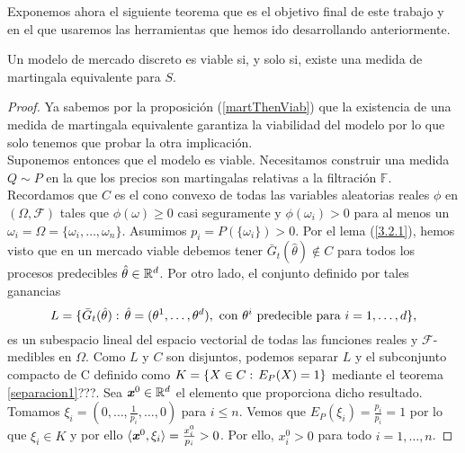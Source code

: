 Exponemos ahora el siguiente teorema que es el objetivo final de este trabajo y en el que usaremos las herramientas que hemos ido desarrollando anteriormente.
\begin{teoremaBox}
	Un modelo de mercado discreto es viable si, y solo si, existe una medida de martingala equivalente para $ S $.
\end{teoremaBox}
\begin{proof}
	Ya sabemos por la proposición (\ref{martThenViab}) que la existencia de una medida de martingala equivalente garantiza la viabilidad del modelo por lo que solo tenemos que probar la otra implicación. \\
	
	Suponemos entonces que el modelo es viable. Necesitamos construir una medida $ Q \sim P $ en la que los precios son martingalas relativas a la filtración $ \mathbb{F} $. Recordamos que $ C $ es el cono convexo de todas las variables aleatorias reales $ \phi $ en $ (\Omega, \mathcal{F}) $ tales que $ \phi(\omega) \geq 0 $ casi seguramente y $ \phi(\omega_i) > 0 $ para al menos un $ \omega_i = \Omega = \{\omega_i,\dots, \omega_n \} $. Asumimos $ p_i = P(\{\omega_i\}) > 0 $. Por el lema (\ref{3.2.1}), hemos visto que en un mercado viable debemos tener $ \bar{G}_t(\hat{\theta}) \notin C$ para todos los procesos predecibles $ \hat{\theta} \in  \mathbb{R}^d $. Por otro lado, el conjunto definido por tales ganancias 
	\[
	L = \{\bar{G}_t(\hat{\theta}):\hspace{0.5mm} \hat{\theta}=(\theta^1,\dots,\theta^d),\text{ con } \theta^i \text{ predecible para } i=1,\dots,d \},
	\]
	es un subespacio lineal del espacio vectorial de todas las funciones reales y  $ \mathcal{F} $-medibles en $ \Omega $. Como $ L $ y $ C $ son disjuntos, podemos separar $ L $ y el subconjunto compacto de C definido como $ K =\{X\in C: \hspace{0.5mm} E_P(X) = 1\} $ mediante el teorema \ref{separacion1}???. Sea $ \textbf{\emph{x}}^0 \in \mathbb{R}^d $ el elemento que proporciona dicho resultado. Tomamos $ \xi_i = (0,\dots,\frac{1}{p_i},\dots,0) $ para $ i \leq n $. Vemos que $ E_P(\xi_i) = \frac{p_i}{p_i} = 1$ por lo que $ \xi_i \in K $ y por ello $ \langle \textbf{\emph{x}}^0, \xi_i \rangle = \frac{x^0_i}{p_i} > 0$. Por ello, $ x^0_i > 0$ para todo $ i=1,\dots,n $.
	

\end{proof}
